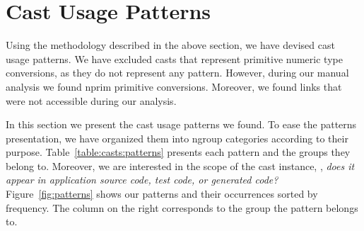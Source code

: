 
\newcommand{\castpatternsection}[1]{\noindent\textbf{#1.}}
\newcommand{\pname}[1]{\textsc{#1}}

\newenvironment{pattern}[1]{
\newcommand{\nocc}{\csname n#1Pattern\endcsname{}}
\newcommand{\noccsrc}{\csname n#1PatternSrc\endcsname{}}
\newcommand{\noccgen}{\csname n#1PatternGen\endcsname{}}
\newcommand{\nocctest}{\csname n#1PatternTest\endcsname{}}
\newcommand{\pocc}{\csname p#1Pattern\endcsname{}}
\newcommand{\desc}{\castpatternsection{Description}}
\newcommand{\instances}{\castpatternsection{Instances: \nocc{} (\pocc\%)}
We found \noccsrc{} in application code, \nocctest{} in test code, and \noccgen{} in generated code.}
\newcommand{\discussion}{\castpatternsection{Discussion}}
\newcommand{\thisp}{\textsc{#1}}
\subsection{\pname{#1}}
\label{pat:#1}
\desc
}{}


\section{Cast Usage Patterns}
\label{sec:casts:patterns}

%
Using the methodology described in the above section,
we have devised \nPattern{} cast usage patterns.
We have excluded casts that represent primitive numeric type conversions,
as they do not represent any pattern.
However, during our manual analysis we found nprim{} primitive conversions.
Moreover, we found \nBrokenLink{} links that were not accessible during our analysis.

In this section we present the cast usage patterns we found.
To ease the patterns presentation,
%
%
we have organized them into ngroup{} categories according to their purpose.
Table~\ref{table:casts:patterns} presents each pattern and the groups they belong to.
Moreover, we are interested in the scope of the cast instance,
\ie, \emph{does it appear in application source code, test code, or generated code?}
%
%
Figure~\ref{fig:patterns} shows our patterns and their occurrences sorted by frequency.
The column on the right corresponds to the group the pattern belongs to.

